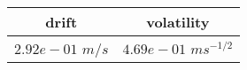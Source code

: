 \begin{tabular}{|c|c|}
\hline
drift & volatility\\
\hline
\hline
$2.92e-01$ $m/s$ & $4.69e-01$ $ms^{-1/2}$\\
\hline
\end{tabular}